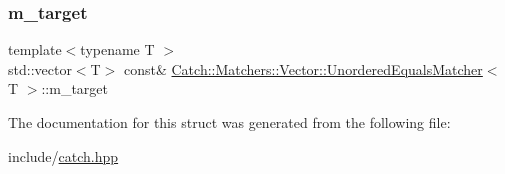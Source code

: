 \subsubsection{\texorpdfstring{m\_target}{m\_target}}
{\footnotesize\ttfamily template$<$typename T $>$ \\
std\+::vector$<$T$>$ const\& \mbox{\hyperlink{struct_catch_1_1_matchers_1_1_vector_1_1_unordered_equals_matcher}{Catch\+::\+Matchers\+::\+Vector\+::\+Unordered\+Equals\+Matcher}}$<$ T $>$\+::m\+\_\+target\hspace{0.3cm}{\ttfamily [private]}}



The documentation for this struct was generated from the following file\+:\begin{DoxyCompactItemize}
\item 
include/\mbox{\hyperlink{catch_8hpp}{catch.\+hpp}}\end{DoxyCompactItemize}
